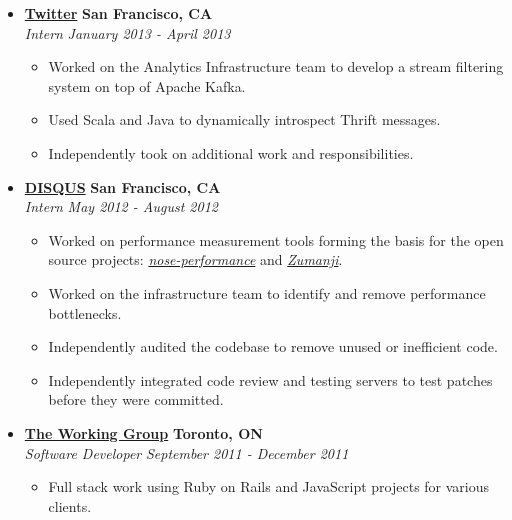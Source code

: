 \documentclass[10pt,letterpaper]{article}
\begin{document}
\begin{itemize}
    \item[]
    {\href{http://www.twitter.com}{\textbf{Twitter}} \hfill
      \textbf{San Francisco, CA}}
    \\
    {\emph{Intern} \hfill \emph{January 2013 - April 2013}}

    \begin{itemize}[label=\textbullet]
      \itemsep0em
      \item Worked on the Analytics Infrastructure team to develop a stream
        filtering system on top of Apache Kafka.
      \item Used Scala and Java to dynamically introspect Thrift messages.
      \item Independently took on additional work and responsibilities.
    \end{itemize}

    \item[]
    {\href{http://www.disqus.com}{\textbf{DISQUS}} \hfill
      \textbf{San Francisco, CA}}
    \\
    {\emph{Intern} \hfill \emph{May 2012 - August 2012}}

    \begin{itemize}[label=\textbullet]
      \itemsep0em
      \item Worked on performance measurement tools forming the basis for the
            open source projects:
            \href{https://github.com/disqus/nose-performance}{\textit{nose-performance}}
            and \href{https://github.com/disqus/zumanji}{\textit{Zumanji}}.
      \item Worked on the infrastructure team to identify and remove performance
            bottlenecks.
      \item Independently audited the codebase to remove unused or inefficient
            code.
      \item Independently integrated code review and testing servers to test
            patches before they were committed.
    \end{itemize}


    \item[]
    {\href{http://www.twg.ca}{\textbf{The Working Group}} \hfill
      \textbf{Toronto, ON}}
    \\
    {\emph{Software Developer} \hfill \emph{September 2011 - December 2011}}

    \begin{itemize}[label=\textbullet]
      \itemsep0em
      \item Full stack work using Ruby on Rails and JavaScript projects for various
        clients.
    \end{itemize}


\end{itemize}
\end{document}
